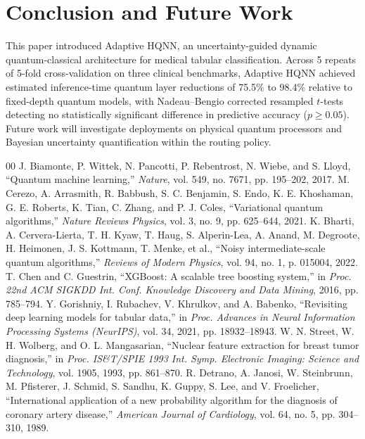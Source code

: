 \documentclass[conference]{IEEEtran}
\begin{document}
\section{Conclusion and Future Work}
This paper introduced Adaptive HQNN, an uncertainty-guided dynamic quantum-classical architecture for medical tabular classification. Across 5 repeats of 5-fold cross-validation on three clinical benchmarks, Adaptive HQNN achieved estimated inference-time quantum layer reductions of 75.5\% to 98.4\% relative to fixed-depth quantum models, with Nadeau--Bengio corrected resampled $t$-tests detecting no statistically significant difference in predictive accuracy ($p \ge 0.05$). Future work will investigate deployments on physical quantum processors and Bayesian uncertainty quantification within the routing policy.

\begin{thebibliography}{00}
 J. Biamonte, P. Wittek, N. Pancotti, P. Rebentrost, N. Wiebe, and S. Lloyd, ``Quantum machine learning,'' \textit{Nature}, vol. 549, no. 7671, pp. 195--202, 2017.
 M. Cerezo, A. Arrasmith, R. Babbush, S. C. Benjamin, S. Endo, K. E. Khoshaman, G. E. Roberts, K. Tian, C. Zhang, and P. J. Coles, ``Variational quantum algorithms,'' \textit{Nature Reviews Physics}, vol. 3, no. 9, pp. 625--644, 2021.
 K. Bharti, A. Cervera-Lierta, T. H. Kyaw, T. Haug, S. Alperin-Lea, A. Anand, M. Degroote, H. Heimonen, J. S. Kottmann, T. Menke, et al., ``Noisy intermediate-scale quantum algorithms,'' \textit{Reviews of Modern Physics}, vol. 94, no. 1, p. 015004, 2022.
 T. Chen and C. Guestrin, ``XGBoost: A scalable tree boosting system,'' in \textit{Proc. 22nd ACM SIGKDD Int. Conf. Knowledge Discovery and Data Mining}, 2016, pp. 785--794.
 Y. Gorishniy, I. Rubachev, V. Khrulkov, and A. Babenko, ``Revisiting deep learning models for tabular data,'' in \textit{Proc. Advances in Neural Information Processing Systems (NeurIPS)}, vol. 34, 2021, pp. 18932--18943.
 W. N. Street, W. H. Wolberg, and O. L. Mangasarian, ``Nuclear feature extraction for breast tumor diagnosis,'' in \textit{Proc. IS\&T/SPIE 1993 Int. Symp. Electronic Imaging: Science and Technology}, vol. 1905, 1993, pp. 861--870.
 R. Detrano, A. Janosi, W. Steinbrunn, M. Pfisterer, J. Schmid, S. Sandhu, K. Guppy, S. Lee, and V. Froelicher, ``International application of a new probability algorithm for the diagnosis of coronary artery disease,'' \textit{American Journal of Cardiology}, vol. 64, no. 5, pp. 304--310, 1989.

\end{thebibliography}
\end{document}
